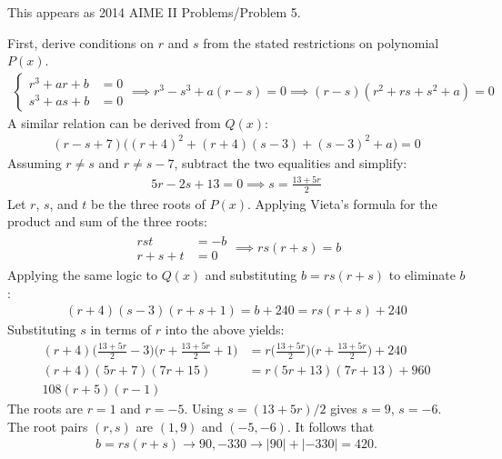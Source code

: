 This appears as 2014 AIME II Problems/Problem 5.

First, derive conditions on $r$ and $s$ from the stated restrictions on polynomial $P(x)$.
\begin{align*}
\left\{\begin{aligned}
r^{3} + ar + b & = 0
\\
s^{3} + as + b & = 0
\end{aligned}\right.
\implies
r^{3} - s^{3} + a (r-s) = 0
\implies
(r - s) (r^{2} + rs + s^{2} + a) = 0
\end{align*}
A similar relation can be derived from $Q(x)$:
\begin{align*}
(r - s + 7) \bigl((r+4)^{2} + (r+4)(s-3) + (s-3)^{2} + a\bigr) = 0
\end{align*}
Assuming $r \ne s$ and $r \ne s-7$, subtract the two equalities and simplify:
\begin{align*}
5r - 2s + 13 = 0
\implies 
s = \frac{13+5r}{2}
\end{align*}
Let $r$, $s$, and $t$ be the three roots of $P(x)$. Applying Vieta's formula for the product and sum of the three roots:
\begin{align*}
\begin{aligned}
rst & = -b
\\ 
r+s+t & = 0
\end{aligned}
\implies
rs(r+s) = b
\end{align*}
Applying the same logic to $Q(x)$ and substituting $b=rs(r+s)$ to eliminate $b$:
\begin{align*}
(r+4)(s-3)(r+s+1) = b+240 = rs(r+s) + 240
\end{align*}
Substituting $s$ in terms of $r$ into the above yields:
\begin{align*}
(r+4) \biggl(\frac{13+5r}{2}-3\biggr)\biggl(r+\frac{13+5r}{2}+1\biggr) 
& = r \biggl(\frac{13+5r}{2}\biggr)\biggl(r+\frac{13+5r}{2}\biggr) + 240
\\[1ex]
(r+4) (5r+7) (7r+15)
& = r (5r+13) (7r+13) + 960
\\[1ex]
108 (r+5) (r-1)
\end{align*}
The roots are $r=1$ and $r=-5$. Using $s=(13+5r)/2$ gives $s=9$, $s=-6$. The root pairs $(r,s)$ are $(1,9)$ and $(-5,-6)$. It follows that
\begin{align*}
b = rs(r+s) 
\to 90, -330
\to |90|+|-330|=420.
\end{align*}


